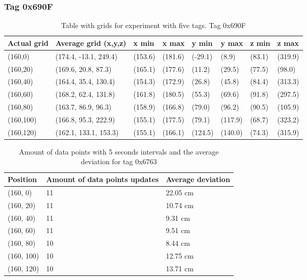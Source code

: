 \subsubsection{Tag 0x690F}
\begin{table}[H]
    \centering
    \begin{tabular}{|l|l|l|l|l|l|l|l|}
        \hline
        Actual grid & Average grid (x,y,z)  & x min   & x max   & y min   & y max   & z min  & z max   \\ \hline
        (160,0)     & (174.4, -13.1, 249.4) & (153.6) & (181.6) & (-29.1) & (8.9)   & (83.1) & (319.9) \\ \hline
        (160,20)    & (169.6, 20.8, 87.3)   & (165.1) & (177.6) & (11.2)  & (29.5)  & (77.5) & (98.0)  \\ \hline
        (160,40)    & (164.4, 35.4, 130.4)  & (154.3) & (172.9) & (26.8)  & (45.8)  & (84.4) & (313.3) \\ \hline
        (160,60)    & (168.2, 62.4, 131.8)  & (161.8) & (180.5) & (55.3)  & (69.6)  & (91.8) & (297.5) \\ \hline
        (160,80)    & (163.7, 86.9, 96.3)   & (158.9) & (166.8) & (79.0)  & (96.2)  & (90.5) & (105.9) \\ \hline
        (160,100)   & (166.8, 95.3, 222.9)  & (155.1) & (177.5) & (79.1)  & (117.9) & (68.7) & (323.2) \\ \hline
        (160,120)   & (162.1, 133.1, 153.3) & (155.1) & (166.1) & (124.5) & (140.0) & (74.3) & (315.9) \\ \hline
    \end{tabular}
    \caption{Table with grids for experiment with five tags. Tag 0x690F}
\end{table}

\begin{table}[H]
    \centering
    \begin{tabular}{|l|l|l|}
        \hline
        Position   & Amount of data points updates & Average deviation \\ \hline
        (160, 0)   & 11                            & 22.05 cm          \\ \hline
        (160, 20)  & 11                            & 10.74 cm          \\ \hline
        (160, 40)  & 11                            & 9.31 cm           \\ \hline
        (160, 60)  & 11                            & 9.51 cm           \\ \hline
        (160, 80)  & 10                            & 8.44 cm           \\ \hline
        (160, 100) & 10                            & 12.75 cm          \\ \hline
        (160, 120) & 10                            & 13.71 cm          \\ \hline
    \end{tabular}
    \caption{Amount of data points with 5 seconds intervals and the average deviation for tag 0x6763}
\end{table}

